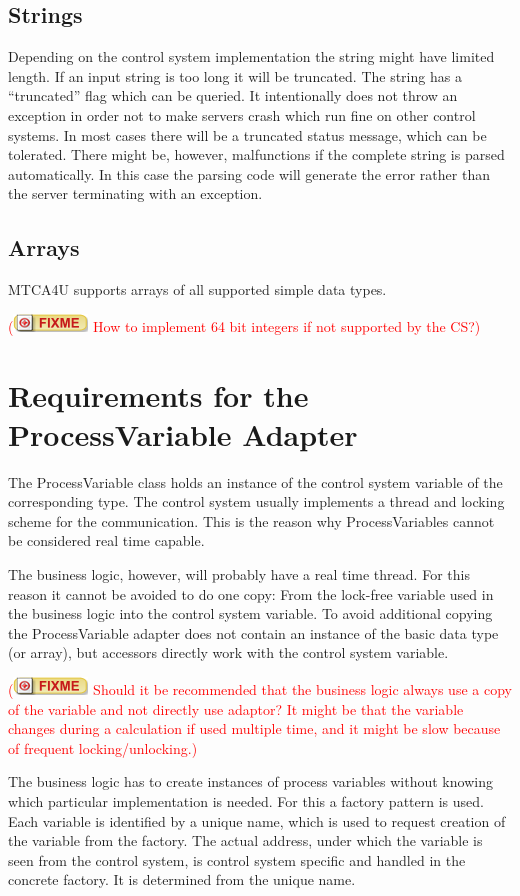 \documentclass[11pt,a4paper]{scrartcl}
\newcounter{nFixmes}
\newcommand{\fixme}[1]{\addtocounter{nFixmes}{1}\textcolor{red}{(\includegraphics[height=2ex]{fixme} #1)}\xspace}
\begin{document}
\subsection{Strings}

Depending on the control system implementation the string might have limited
length. If an input string is too long it will be truncated. The string has a
“truncated” flag which can be queried. It intentionally does not throw an
exception in order not to make servers crash which run fine on other control
systems. In most cases there will be a truncated status message, which can be
tolerated. There might be, however, malfunctions if the complete string is
parsed automatically. In this case the parsing code will generate the error
rather than the server terminating with an exception. 

\subsection{Arrays}

MTCA4U supports arrays of all supported simple data types. \fixme{How to implement 64 bit integers if not supported by the CS?}

\section{Requirements for the ProcessVariable Adapter}\label{section_process_variable_adapter}

The ProcessVariable class holds an instance of the control system variable of
the corresponding type. The control system usually implements a thread and
locking scheme for the communication. This is the reason why ProcessVariables
cannot be considered real time capable. 

The business logic, however, will probably have a real time thread. For this
reason it cannot be avoided to do one copy: From the lock-free variable used
in the business logic into the control system variable. To avoid additional
copying the ProcessVariable adapter does not contain an instance of the basic
data type (or array), but accessors directly work with the control system
variable. \fixme{Should it be recommended that the business logic always use a
  copy of the variable and not directly use adaptor? It might be that the
  variable changes during a calculation if used multiple time, and it might be
  slow because of frequent locking/unlocking.}  

The business logic has to create instances of process variables without
knowing which particular implementation is needed. For this a factory pattern
is used. Each variable is identified by a unique name, which is used to
request creation of the variable from the factory. The actual address, under
which the variable is seen from the control system, is control system specific
and handled in the concrete factory. It is determined from the unique name. 
\end{document}
